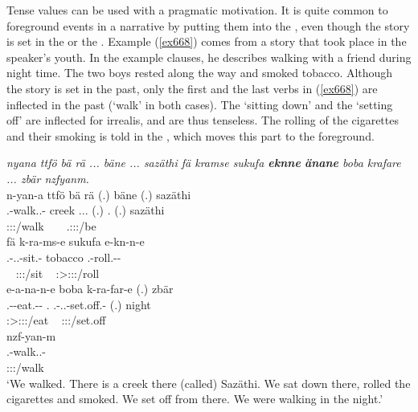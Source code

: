 Tense values can be used with a pragmatic motivation. It is quite common to foreground events in a narrative by putting them into the , even though the story is set in the  or the . Example (\ref{ex668}) comes from a story that took place in the speaker's youth. In the example clauses, he describes walking with a friend during night time. The two boys rested along the way and smoked tobacco. Although the story is set in the past, only the first and the last verbs in (\ref{ex668}) are inflected in the past  (`walk' in both cases). The `sitting down' and the `setting off' are inflected for irrealis, and are thus tenseless. The rolling of the cigarettes and their smoking is told in the , which moves this part to the foreground.

\begin{exe}
	\ex \emph{nyana ttfö bä rä ... bäne ... sazäthi fä kramse sukufa \textbf{eknne} \textbf{änane} boba krafare ... zbär nzfyanm.}\\
	\glll n-yan-a ttfö bä rä (.) bäne (.) sazäthi\\
	\Fnsg.\Alph-walk.\Ext.\Du-\Pst{} creek \Med{} \Tsg.\F.\Cop.{\Ndu} (.) \Recog.{\Abs} (.) sazäthi\\
	{\footnotesize \Fdu:\Sbj:\Pst:\Ipfv/walk} ~ ~ {\footnotesize \Tsg.\F:\Sbj:\Nonpast:\Ipfv/be} ~ ~ ~ ~\\
	\sn
	\glll fä k-ra-ms-e sukufa e-kn-n-e\\
	{\Dist} \M.\Bet-\Irr.\Vc.\Du-sit.\Rs-{\Fnsg} tobacco \Stnsg.\Alph-roll.\Ext-\Du-{\Fnsg}\\
	~ {\footnotesize \Fdu:\Sbj:\Irr:\Pfv/sit} ~ {\footnotesize \Fdu:\Sbj>\Stpl:\Obj:\Nonpast:\Ipfv/roll}\\
	\sn
	\glll e-a-na-n-e boba k-ra-far-e (.) zbär\\ 
	\Stnsg.\Alph-\Vc-eat.\Ext-\Du-{\Fnsg} \Med.{\Abl} \M.\Alph-\Irr.\Vc.\Du-set.off.\Rs-{\Fnsg} (.) night\\
	{\footnotesize \Fdu:\Sbj>\Stpl:\Obj:\Nonpast:\Ipfv/eat} ~ {\footnotesize \Fdu:\Sbj:\Irr:\Pfv/set.off} ~ ~\\
	\sn
	\glll nzf-yan-m\\
	\Fnsg.\Betatwo-walk.\Ext.\Du-\Dur{}\\
	{\footnotesize \Fdu:\Sbj:\Pst:\Dur/walk}\\
	\trans `We walked. There is a creek there (called) Sazäthi. We sat down there, rolled the cigarettes and smoked. We set off from there. We were walking in the night.' 
	\label{ex668}
\end{exe}

